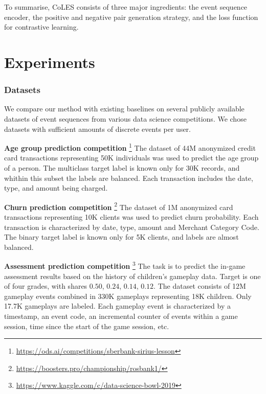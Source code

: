 \documentclass[sigconf, anonymous]{acmart}
\begin{document}
\medskip
To summarise, CoLES consists of three major ingredients: the event sequence encoder, the positive
and negative pair generation strategy, and the loss function for contrastive learning.


\section{Experiments} \label{sec-exp}

\subsubsection{Datasets}

We compare our method with existing baselines on several publicly available datasets of
event sequences from various data science competitions. We chose datasets with sufficient
amounts of discrete events per user.

\textbf{Age group prediction competition}%
\footnote{
    \url{https://ods.ai/competitions/sberbank-sirius-lesson}
}
The dataset of 44M an\-onymized credit card transactions representing 50K individuals
was used to predict the age group of a person. The multiclass target label is known only for 30K records,
and whithin this subset the labels are balanced. Each transaction includes the date, type,
and amount being charged.


\textbf{Churn prediction competition}%
\footnote{
    \url{https://boosters.pro/championship/rosbank1/}
}
The dataset of 1M an\-onymiz\-ed card transactions representing 10K clients was used to
predict churn probability. Each transaction is characterized by date, type, amount and
Merchant Category Code. The binary target label is known only for 5K clients, and labels are almost balanced.

\textbf{Assessment prediction competition}%
\footnote{
    \url{https://www.kaggle.com/c/data-science-bowl-2019}
}
The task is to predict the in-game assessment results based on the history of children's
gameplay data. Target is one of four grades, with shares $0.50$, $0.24$, $0.14$, $0.12$.
The dataset consists of 12M gameplay events combined in 330K gameplays representing 18K
children. Only 17.7K gameplays are labeled.
Each gameplay event is characterized by a timestamp, an event code, an incremental counter
of events within a game session, time since the start of the game session, etc.
\end{document}
